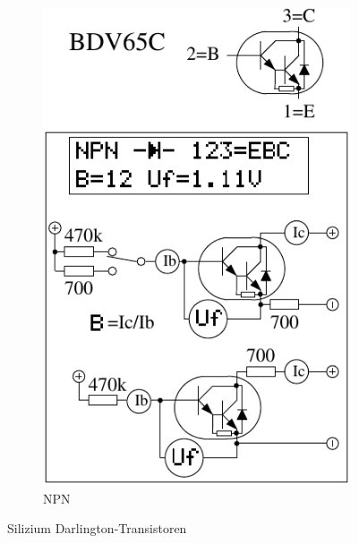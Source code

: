 \begin{figure}[H]
\begin{subfigure}[b]{.5\textwidth}
    \includegraphics[width=1.\textwidth]{../FIG/BJT_BDV65.pdf}
    \caption{NPN}
    \label{fig:BJT-NPN-Darl-R-D}
  \end{subfigure}
  \caption{Silizium Darlington-Transistoren}
\end{figure}
